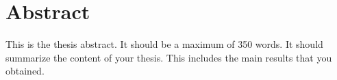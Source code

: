 \thispagestyle{empty}
\section*{Abstract}

\begin{doublespace}
This is the thesis abstract. It should be a maximum of 350 words. It should summarize the
content of your thesis. This includes the main results that
you obtained. 
\end{doublespace}

